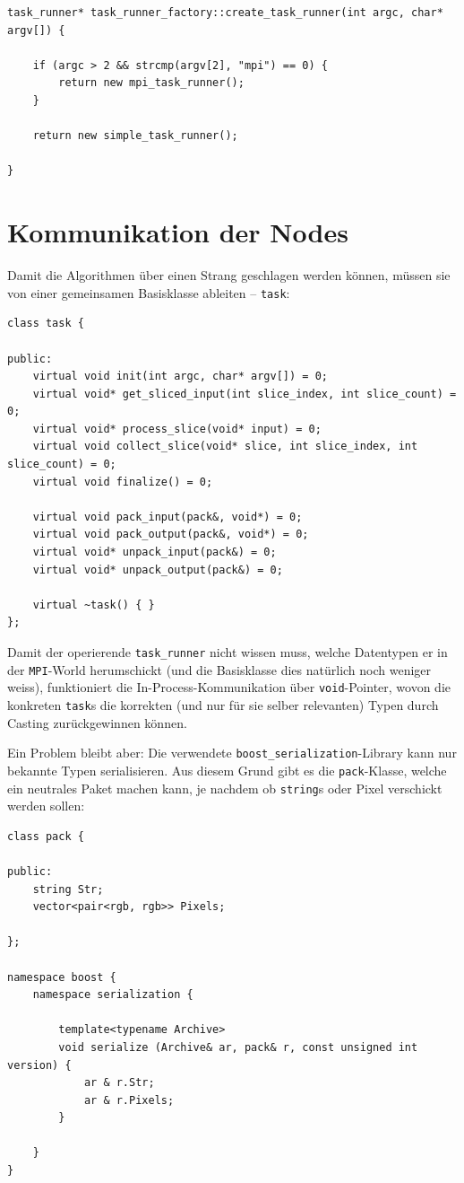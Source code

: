 \documentclass[11pt]{scrreprt} %
\theoremstyle{definition}
\begin{document}
\begin{lstlisting}
task_runner* task_runner_factory::create_task_runner(int argc, char* argv[]) {

	if (argc > 2 && strcmp(argv[2], "mpi") == 0) {
		return new mpi_task_runner();
	}

	return new simple_task_runner();

}
\end{lstlisting}

\section{Kommunikation der Nodes}

Damit die Algorithmen über einen Strang geschlagen werden können, müssen sie von einer gemeinsamen Basisklasse ableiten -- {\tt task}:

\begin{lstlisting}
class task {

public:
	virtual void init(int argc, char* argv[]) = 0;
	virtual void* get_sliced_input(int slice_index, int slice_count) = 0;
	virtual void* process_slice(void* input) = 0;
	virtual void collect_slice(void* slice, int slice_index, int slice_count) = 0;
	virtual void finalize() = 0;

	virtual void pack_input(pack&, void*) = 0;
	virtual void pack_output(pack&, void*) = 0;
	virtual void* unpack_input(pack&) = 0;
	virtual void* unpack_output(pack&) = 0;

	virtual ~task() { }
};

\end{lstlisting}

Damit der operierende {\tt task\_runner} nicht wissen muss, welche Datentypen er in der {\tt MPI}-World herumschickt (und die Basisklasse dies natürlich noch weniger weiss), funktioniert die In-Process-Kommunikation über {\tt void}-Pointer, wovon die konkreten {\tt task}s die korrekten (und nur für sie selber relevanten) Typen durch Casting zurückgewinnen können.

Ein Problem bleibt aber: Die verwendete {\tt boost\_serialization}-Library kann nur bekannte Typen serialisieren. Aus diesem Grund gibt es die {\tt pack}-Klasse, welche ein neutrales Paket machen kann, je nachdem ob {\tt string}s oder Pixel verschickt werden sollen:

\begin{lstlisting}
class pack {

public:
	string Str;
	vector<pair<rgb, rgb>> Pixels;

};

namespace boost {
	namespace serialization {

		template<typename Archive>
		void serialize (Archive& ar, pack& r, const unsigned int version) {
			ar & r.Str;
			ar & r.Pixels;
		}

	}
}
\end{lstlisting}
\end{document}
